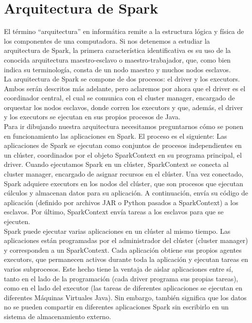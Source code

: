 \chapter{Arquitectura de Spark}

El término “arquitectura” en informática remite a la estructura lógica y física de los componentes de una computadora. Si nos detenemos a estudiar la arquitectura de Spark, la primera característica identificativa es su uso de la conocida arquitectura maestro-esclavo o maestro-trabajador, que, como bien indica su terminología, consta de un nodo maestro y muchos nodos esclavos.\\
 
La arquitectura de Spark se compone de dos procesos: el driver y los executors. Ambos serán descritos más adelante, pero aclaremos por ahora que el driver es el coordinador central, el cual se comunica con el cluster manager, encargado de orquestar los nodos esclavos, donde corren los executors y que, además, el driver y los executors se ejecutan en sus propios procesos de Java.\\
 
Para ir dibujando nuestra arquitectura necesitamos preguntarnos cómo se ponen en funcionamiento las aplicaciones en Spark. El proceso es el siguiente: Las aplicaciones de Spark se ejecutan como conjuntos de procesos independientes en un clúster, coordinados por el objeto SparkContext en su programa principal, el driver. Cuando ejecutamos Spark en un clúster, SparkContext se conecta al cluster manager, encargado de asignar recursos en el clúster. Una vez conectado, Spark adquiere executors en los nodos del clúster, que son procesos que ejecutan cúlculos y almacenan datos para su aplicación. A continuación, envía su código de aplicación (definido por archivos JAR o Python pasados a SparkContext) a los esclavos. Por último, SparkContext envía tareas a los esclavos para que se ejecuten.\\
 
Spark puede ejecutar varias aplicaciones en un clúster al mismo tiempo. Las aplicaciones están programadas por el administrador del clúster (cluster manager) y corresponden a un SparkContext. Cada aplicación obtiene sus propios agentes executors, que permanecen activos durante toda la aplicación y ejecutan tareas en varios subprocesos. Este hecho tiene la ventaja de aislar aplicaciones entre sí, tanto en el lado de la programación (cada driver programa sus propias tareas), como en el lado del executor (las tareas de diferentes aplicaciones se ejecutan en diferentes Máquinas Virtuales Java). Sin embargo, también significa que los datos no se pueden compartir en diferentes aplicaciones Spark sin escribirlo en un sistema de almacenamiento externo.\\
 
